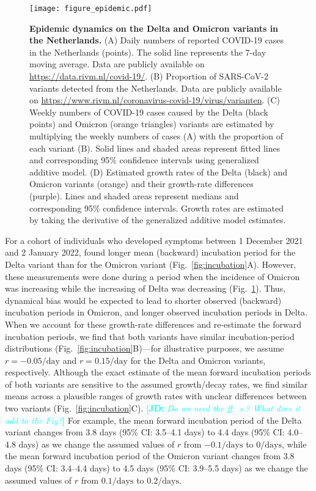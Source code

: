 \documentclass[12pt]{article}
\newcommand{\comment}{\showcomment}
\newcommand{\showcomment}[3]{\textcolor{#1}{\textbf{[#2: }\textsl{#3}\textbf{]}}}
\newcommand{\jd}[1]{\comment{cyan}{JD}{#1}}
\newcommand{\fref}[1]{Fig.~\ref{fig:#1}}
\begin{document}
\begin{figure}[!ht]
\texttt{[image: figure\_epidemic.pdf]}
\caption{
\textbf{Epidemic dynamics on the Delta and Omicron variants in the Netherlands.}
(A) Daily numbers of reported COVID-19 cases in the Netherlands (points).
The solid line represents the 7-day moving average.
Data are publicly available on \url{https://data.rivm.nl/covid-19/}.
(B) Proportion of SARS-CoV-2 variants detected from the Netherlands. Data are publicly available on \url{https://www.rivm.nl/coronavirus-covid-19/virus/varianten}.
(C) Weekly numbers of COVID-19 cases caused by the Delta (black points) and Omicron (orange triangles) variants are estimated by multiplying the weekly numbers of cases (A) with the proportion of each variant (B).
Solid lines and shaded areas represent fitted lines and corresponding 95\% confidence intervals using generalized additive model.
(D) Estimated growth rates of the Delta (black) and Omicron variants (orange) and their growth-rate differences (purple).
Lines and shaded areas represent medians and corresponding 95\% confidence intervals.
Growth rates are estimated by taking the derivative of the generalized additive model estimates.
\label{fig:epidemic}
}
\end{figure}

For a cohort of individuals who developed symptoms between 1 December 2021 and 2 January 2022, \citep{backer2021omicron} found longer mean (backward) incubation period for the Delta variant than for the Omicron variant (\fref{incubation}A).
However, these measurements were done during a period when the incidence of Omicron was increasing while the increasing of Delta was decreasing (\fref{epidemic}).
Thus, dynamical bias would be expected to lead to shorter observed (backward) incubation periods in Omicron, and longer observed incubation periods in Delta. 
When we account for these growth-rate differences and re-estimate the forward incubation periods, we find that both variants have similar incubation-period distributions (\fref{incubation}B)---for illustrative purposes, we assume $r=-0.05/\mathrm{day}$ and $r=0.15/\mathrm{day}$ for the Delta and Omicron variants, respectively.
Although the exact estimate of the mean forward incubation periods of both variants are sensitive to the assumed growth/decay rates, we find similar means across a plausible ranges of growth rates with unclear differences between two variants (\fref{incubation}C).
\jd{Do we need the ff.~s.? What does it add to the Fig?}
For example, the mean forward incubation period of the Delta variant changes from 3.8 days (95\% CI: 3.5--4.1 days) to 4.4 days (95\% CI: 4.0--4.8 days) as we change the assumed values of $r$ from $-0.1/\mathrm{days}$ to $0/\mathrm{days}$, while
the mean forward incubation period of the Omicron variant changes from 3.8 days (95\% CI: 3.4--4.4 days) to 4.5 days (95\% CI: 3.9--5.5 days) as we change the assumed values of $r$ from $0.1/\mathrm{days}$ to $0.2/\mathrm{days}$.
\end{document}
